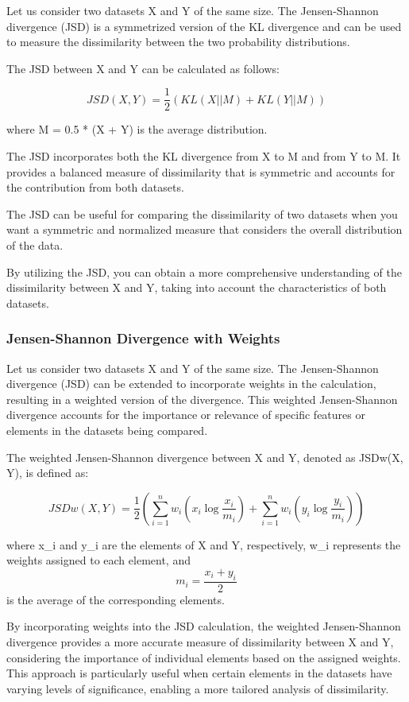 Let us consider two datasets X and Y of the same size. The Jensen-Shannon divergence (JSD) is a symmetrized version of the KL divergence and can be used to measure the dissimilarity between the two probability distributions.

The JSD between X and Y can be calculated as follows:

\[JSD(X, Y) = \frac{1}{2} \left( KL(X || M) + KL(Y || M) \right)\]

where M = 0.5 * (X + Y) is the average distribution.

The JSD incorporates both the KL divergence from X to M and from Y to M. It provides a balanced measure of dissimilarity that is symmetric and accounts for the contribution from both datasets.

The JSD can be useful for comparing the dissimilarity of two datasets when you want a symmetric and normalized measure that considers the overall distribution of the data.

By utilizing the JSD, you can obtain a more comprehensive understanding of the dissimilarity between X and Y, taking into account the characteristics of both datasets.

\subsubsection{Jensen-Shannon Divergence with Weights}

Let us consider two datasets X and Y of the same size. The Jensen-Shannon divergence (JSD) can be extended to incorporate weights in the calculation, resulting in a weighted version of the divergence. This weighted Jensen-Shannon divergence accounts for the importance or relevance of specific features or elements in the datasets being compared.

The weighted Jensen-Shannon divergence between X and Y, denoted as JSDw(X, Y), is defined as:

\[JSDw(X, Y) = \frac{1}{2} \left( \sum_{i=1}^{n} w_i \left( x_i \log \frac{x_i}{m_i} \right) + \sum_{i=1}^{n} w_i \left( y_i \log \frac{y_i}{m_i} \right) \right)\]

where x\_i and y\_i are the elements of X and Y, respectively, w\_i represents the weights assigned to each element, and \[m_i = \frac{{x_i + y_i}}{2}\] is the average of the corresponding elements.

By incorporating weights into the JSD calculation, the weighted Jensen-Shannon divergence provides a more accurate measure of dissimilarity between X and Y, considering the importance of individual elements based on the assigned weights. This approach is particularly useful when certain elements in the datasets have varying levels of significance, enabling a more tailored analysis of dissimilarity.
